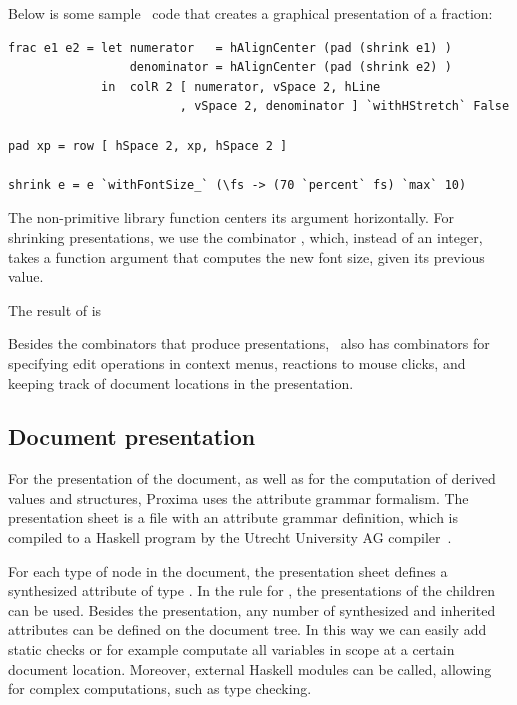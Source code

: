 \documentclass[12pt]{article}
\begin{document}
Below is some sample \Xprez\ code that creates a graphical presentation of a fraction:

\begin{footnotesize}
\begin{verbatim}
frac e1 e2 = let numerator   = hAlignCenter (pad (shrink e1) )
                 denominator = hAlignCenter (pad (shrink e2) )
             in  colR 2 [ numerator, vSpace 2, hLine
                        , vSpace 2, denominator ] `withHStretch` False
                        
pad xp = row [ hSpace 2, xp, hSpace 2 ]

shrink e = e `withFontSize_` (\fs -> (70 `percent` fs) `max` 10)
\end{verbatim}
\end{footnotesize}

The non-primitive library function  centers its argument horizontally. For shrinking presentations, we use the combinator , which, instead of an integer, takes a function argument that computes the new font size, given its previous value.

The result of  is~~

Besides the combinators that produce presentations, \Xprez\ also has combinators for specifying edit operations in context menus, reactions to mouse clicks, and keeping track of document locations in the presentation.


\subsection{Document presentation}

For the presentation of the document, as well as for the computation of derived values and structures, Proxima uses the attribute grammar formalism. The presentation sheet is a file with an attribute grammar definition, which is compiled to a Haskell program by the Utrecht University AG compiler~\cite{swierstra08ag}.

For each type of node in the document, the presentation sheet defines a synthesized attribute  of type . In the rule for , the presentations of the children can be used. Besides the presentation, any number of synthesized and inherited attributes can be defined on the document tree. In this way we can easily add static checks or for example computate all variables in scope at a certain document location. Moreover, external Haskell modules can be called, allowing for complex computations, such as type checking.
\end{document}
